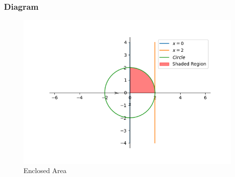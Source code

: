 \documentclass{beamer}
\theoremstyle{remark}
\numberwithin{equation}{section}
\begin{document}
\begin{frame}
	\frametitle{Diagram}
	\begin{figure}[H]
		\centering
		\includegraphics[width=0.7\linewidth]{figs/Figure_1.png}
		\caption{Enclosed Area}
	\end{figure}
\end{frame}
\end{document}
